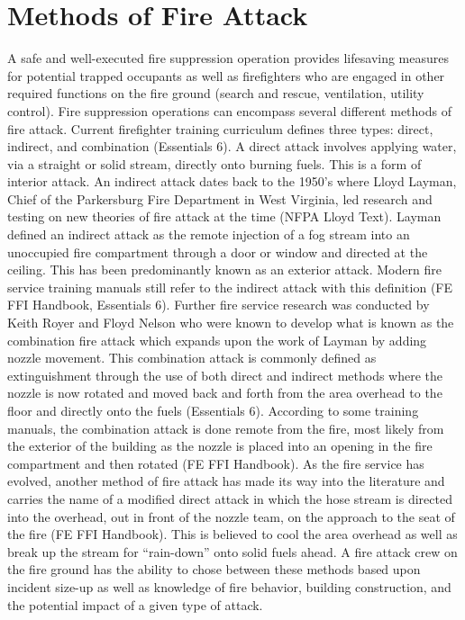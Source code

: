 \documentclass[12pt,oneside]{book}
\begin{document}
\section*{Methods of Fire Attack}

A safe and well-executed fire suppression operation provides lifesaving measures for potential trapped occupants as well as firefighters who are engaged in other required functions on the fire ground (search and rescue, ventilation, utility control). Fire suppression operations can encompass several different methods of fire attack. Current firefighter training curriculum defines three types: direct, indirect, and combination (Essentials 6). A direct attack involves applying water, via a straight or solid stream, directly onto burning fuels. This is a form of interior attack. An indirect attack dates back to the 1950's where Lloyd Layman, Chief of the Parkersburg Fire Department in West Virginia, led research and testing on new theories of fire attack at the time (NFPA Lloyd Text). Layman defined an indirect attack as the remote injection of a fog stream into an unoccupied fire compartment through a door or window and directed at the ceiling. This has been predominantly known as an exterior attack. Modern fire service training manuals still refer to the indirect attack with this definition (FE FFI Handbook, Essentials 6). Further fire service research was conducted by Keith Royer and Floyd Nelson who were known to develop what is known as the combination fire attack which expands upon the work of Layman by adding nozzle movement. This combination attack is commonly defined as extinguishment through the use of both direct and indirect methods where the nozzle is now rotated and moved back and forth from the area overhead to the floor and directly onto the fuels (Essentials 6). According to some training manuals, the combination attack is done remote from the fire, most likely from the exterior of the building as the nozzle is placed into an opening in the fire compartment and then rotated (FE FFI Handbook). As the fire service has evolved, another method of fire attack has made its way into the literature and carries the name of a modified direct attack in which the hose stream is directed into the overhead, out in front of the nozzle team, on the approach to the seat of the fire (FE FFI Handbook). This is believed to cool the area overhead as well as break up the stream for ``rain-down'' onto solid fuels ahead. A fire attack crew on the fire ground has the ability to chose between these methods based upon incident size-up as well as knowledge of fire behavior, building construction, and the potential impact of a given type of attack.
\end{document}
